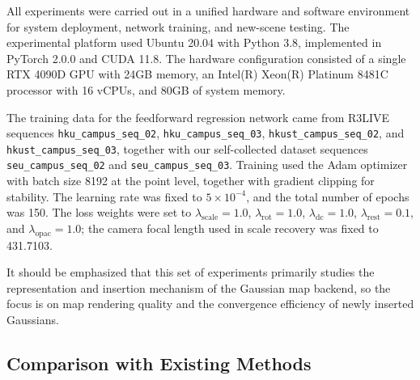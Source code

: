 \documentclass[lettersize,journal]{IEEEtran}
\begin{document}
All experiments were carried out in a unified hardware and software environment for system deployment, network training, and new-scene testing. The experimental platform used Ubuntu 20.04 with Python 3.8, implemented in PyTorch 2.0.0 and CUDA 11.8. The hardware configuration consisted of a single RTX 4090D GPU with 24GB memory, an Intel(R) Xeon(R) Platinum 8481C processor with 16 vCPUs, and 80GB of system memory.

The training data for the feedforward regression network came from R3LIVE sequences \texttt{hku\_campus\_seq\_02}, \texttt{hku\_campus\_seq\_03}, \texttt{hkust\_campus\_seq\_02}, and \texttt{hkust\_campus\_seq\_03}, together with our self-collected dataset sequences \texttt{seu\_campus\_seq\_02} and \texttt{seu\_campus\_seq\_03}. Training used the Adam optimizer with batch size 8192 at the point level, together with gradient clipping for stability. The learning rate was fixed to $5\times10^{-4}$, and the total number of epochs was 150. The loss weights were set to $\lambda_{\text{scale}}=1.0$, $\lambda_{\text{rot}}=1.0$, $\lambda_{\text{dc}}=1.0$, $\lambda_{\text{rest}}=0.1$, and $\lambda_{\text{opac}}=1.0$; the camera focal length used in scale recovery was fixed to 431.7103.

It should be emphasized that this set of experiments primarily studies the representation and insertion mechanism of the Gaussian map backend, so the focus is on map rendering quality and the convergence efficiency of newly inserted Gaussians.

\subsection{Comparison with Existing Methods}
\end{document}
